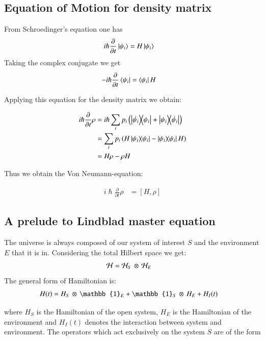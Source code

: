 \subsection{Equation of Motion for density matrix}   
From Schroedinger's equation one has
\begin{align}\label{aft33:23}
i\hslash \frac { \partial  }{ \partial t } \ket{\psi_{i}}&=H\ket{\psi_{i}}
\end{align}
Taking the complex conjugate we get 
\begin{align}
-i\hslash \frac { \partial  }{ \partial t } \bra{\psi_{i}}&=\bra{\psi_{i}}H
\end{align}

Applying  this equation for the density matrix  we obtain:

\begin{align}\label{aft33:24}
i\hslash \frac { \partial  }{ \partial t }\rho&=i\hslash\sum_{i}{p}_{i}\left(\dyad{\dot { \psi_{i}  }}{\psi_{i}} + \dyad{\psi_{i}}{\dot { \psi_{i}  }} \right)\notag\\
&=\sum_{i}{p}_{i}\left(H\dyad{{ \psi_{i}  }}{\psi_{i}} - \dyad{\psi_{i}}{{ \psi_{i}  }}H \right)\notag\\
&=H{\rho} - {\rho}H
\end{align}

Thus we obtain the  Von Neumann-equation: 

\begin{align}\label{aft33:25}
i\hslash \frac { \partial  }{ \partial t }\rho &=\left[H,\rho\right]
\end{align}

\subsection{A prelude to Lindblad  master equation}
The universe is always composed of our system of interest
$S$ and the environment $E$ that it is in. Considering the total Hilbert space we get:
\begin{align}\label{aft33:42}
\mathcal{H} &= \mathcal{H}_{S}\thinspace \otimes\thinspace \mathcal{H}_{E}
\end{align}
The general form of Hamiltonian is:
\begin{align}\label{aft33:43}
H(t)&=H_{S}\thinspace \otimes\thinspace\mathbb{1}_{E} + \mathbb{1}_{S}\thinspace \otimes\thinspace H_{E}+ H_{I} (t) 
\end{align}

where $H_{S}$ is the Hamiltonian of the open system, $H_{E}$ is the Hamiltonian of the environment and $H_{I} (t)$ denotes the interaction between system and environment.
The operators which act exclusively  on the system $S$ are of the form 

